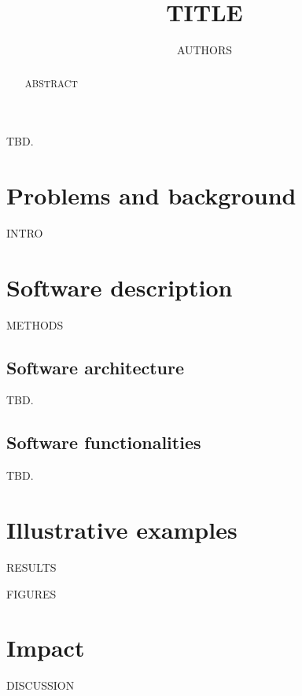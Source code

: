 \documentclass[preprint,review,12pt]{elsarticle}
\begin{document}
\begin{frontmatter}

\title{{{TITLE}}}
\author{{{AUTHORS}}}

\begin{abstract}
{ABSTRACT} %
\end{abstract}

\begin{keyword}
TBD. %
\end{keyword}

\end{frontmatter}
\linenumbers

\section{Problems and background}
{INTRO}

\section{Software description}
{METHODS}

\subsection{Software architecture}
TBD.

\subsection{Software functionalities}
TBD.

\section{Illustrative examples}
{RESULTS}

{FIGURES}

\section{Impact}
{DISCUSSION}
\end{document}
